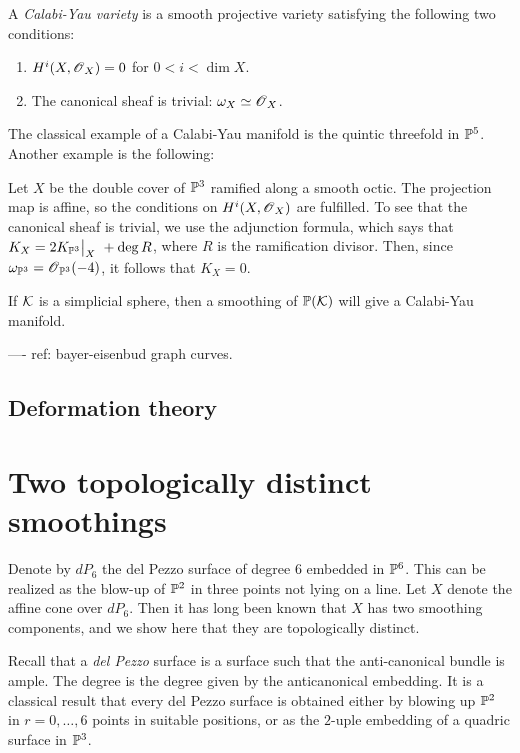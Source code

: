 \documentclass[]{uiophd}
\begin{document}
\begin{defi}
A \emph{Calabi-Yau variety} is a smooth projective variety satisfying the following two conditions:
\begin{enumerate}
	\item $H^i(X,\operatorname{\mathscr{O}}_X)=0$ for $0 < i < \dim X$.
	\item The canonical sheaf is trivial: $\omega_X \simeq \operatorname{\mathscr{O}}_X$. 
\end{enumerate}
\end{defi}

The classical example of a Calabi-Yau manifold is the quintic threefold in $\mathbb{P}^5$. Another example is the following:

\begin{example}
Let $X$ be the double cover of $\mathbb{P}^3$ ramified along a smooth octic. The projection map is affine, so the conditions on $H^i(X,\operatorname{\mathscr{O}}_X)$ are fulfilled. To see that the canonical sheaf is trivial, we use the adjunction formula, which says that $K_X= 2 \restr{K_{\PP^3}}{X} + \deg R$, where $R$ is the ramification divisor. Then, since $\omega_{\mathbb{P}^3}=\operatorname{\mathscr{O}}_{\mathbb{P}^3}(-4)$, it follows that $K_X=0$.
\end{example}

If $\mathcal K$ is a simplicial sphere, then a smoothing of $\mathbb{P}(\mathcal K)$ will give a Calabi-Yau manifold. 

---- ref: bayer-eisenbud graph curves.

\section{Deformation theory}

\chapter{Two topologically distinct smoothings}

Denote by $dP_6$ the del Pezzo surface of degree 6 embedded in $\mathbb{P}^6$. This can be realized as the blow-up of $\mathbb{P}^2$ in three points not lying on a line. Let $X$ denote the affine cone over $dP_6$. Then it has long been known that $X$ has two smoothing components, and we show here that they are topologically distinct.

Recall that a \emph{del Pezzo} surface is a surface such that the anti-canonical bundle is ample. The degree is the degree given by the anticanonical embedding. It is a classical result that every del Pezzo surface is obtained either by blowing up $\mathbb{P}^2$ in $r=0,\ldots,6$ points in suitable positions, or as the $2$-uple embedding of a quadric surface in $\mathbb{P}^3$. 
\end{document}
